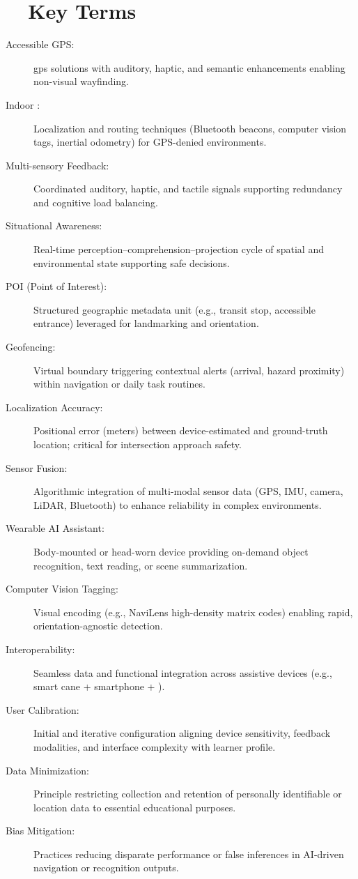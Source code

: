 \section{~~Key Terms}\label{ch8:sec:key-terms}
\begin{description}
	\item[Accessible GPS:] \gls{gps} solutions with auditory, haptic, and semantic enhancements enabling non-visual wayfinding.\supercite{AFBGPS2023}
	\item[Indoor :] Localization and routing techniques (Bluetooth beacons, computer vision tags, inertial odometry) for GPS-denied environments.\supercite{navilens}
	\item[Multi-sensory Feedback:] Coordinated auditory, haptic, and tactile signals supporting redundancy and cognitive load balancing.\supercite{InclusiveCityMaker2023}
	\item[Situational Awareness:] Real-time perception–comprehension–projection cycle of spatial and environmental state supporting safe decisions.\supercite{OrientationMobilityInstruction}
	\item[POI (Point of Interest):] Structured geographic metadata unit (e.g., transit stop, accessible entrance) leveraged for landmarking and orientation.\supercite{AFBGPS2023}
	\item[Geofencing:] Virtual boundary triggering contextual alerts (arrival, hazard proximity) within navigation or daily task routines.
	\item[Localization Accuracy:] Positional error (meters) between device-estimated and ground-truth location; critical for intersection approach safety.\supercite{InclusiveCityMaker2023}
	\item[Sensor Fusion:] Algorithmic integration of multi-modal sensor data (GPS, IMU, camera, LiDAR, Bluetooth) to enhance reliability in complex environments.\supercite{bipedai}
	\item[Wearable AI Assistant:] Body-mounted or head-worn device providing on-demand object recognition, text reading, or scene summarization.\supercite{msseeingai, envision}
	\item[Computer Vision Tagging:] Visual encoding (e.g., NaviLens high-density matrix codes) enabling rapid, orientation-agnostic detection.\supercite{navilens}
	\item[Interoperability:] Seamless data and functional integration across assistive devices (e.g., smart cane + smartphone + ).\supercite{WeWALK}
	\item[User Calibration:] Initial and iterative configuration aligning device sensitivity, feedback modalities, and interface complexity with learner profile.
	\item[Data Minimization:] Principle restricting collection and retention of personally identifiable or location data to essential educational purposes.\supercite{DataPrivacyAI}
	\item[Bias Mitigation:] Practices reducing disparate performance or false inferences in AI-driven navigation or recognition outputs.\supercite{AI_Ethics_Bias, Bias_in_AI}
\end{description}

